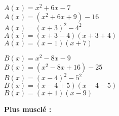 \begin{minipage}{.5 \textwidth}
$ A(x) = x^2 + 6x - 7 $\\

$ A(x) = \left(x^2 + 6x + 9\right) - 16 $\\

$ A(x) = \left(x + 3 \right)^2 - 4^2 $\\

$ A(x) = \left(x+3-4\right)\left(x+3+4\right) $\\

$ A(x) = \left(x-1\right)\left(x+7\right) $
\end{minipage}
\begin{minipage}{.5 \textwidth}
$ B(x) = x^2 - 8x - 9 $\\

$ B(x) = \left(x^2-8x+16\right) - 25 $\\

$ B(x) = \left(x-4\right)^2 - 5^2 $\\

$ B(x) = \left(x-4+5\right)\left(x-4-5\right) $\\

$ B(x) = \left(x+1\right)\left(x-9\right) $
\end{minipage}


\vspace{1cm}


\textbf{Plus musclé :}

\vspace{1cm}


